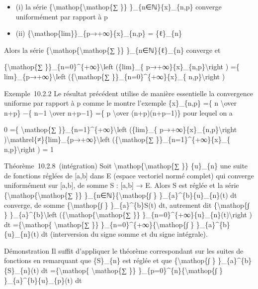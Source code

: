 \documentclass[]{article}
\begin{document}
\begin{itemize}
\itemsep1pt\parskip0pt
\item
  (i) la série \{\textbackslash{}mathop\{\textbackslash{}mathop\{∑ \}\}
  \}\_\{n∈ℕ\}\{x\}\_\{n,p\} converge uniformément par rapport à p
\item
  (ii) \{\textbackslash{}mathop\{lim\}\}\_\{p→+∞\}\{x\}\_\{n,p\} =
  \{ℓ\}\_\{n\}
\end{itemize}

Alors la série \{\textbackslash{}mathop\{\textbackslash{}mathop\{∑ \}\}
\}\_\{n∈ℕ\}\{ℓ\}\_\{n\} converge et

\{\textbackslash{}mathop\{∑ \}\}\_\{n=0\}\^{}\{+∞\}\textbackslash{}left
(\{lim\}\_\{ p→+∞\}\{x\}\_\{n,p\}\textbackslash{}right ) =\{
lim\}\_\{p→+∞\}\textbackslash{}left (\{\textbackslash{}mathop\{∑
\}\}\_\{n=0\}\^{}\{+∞\}\{x\}\_\{ n,p\}\textbackslash{}right )

Exemple~10.2.2 Le résultat précédent utilise de manière essentielle la
convergence uniforme par rapport à p comme le montre l'exemple
\{x\}\_\{n,p\} =\{ n \textbackslash{}over n+p\} −\{ n−1
\textbackslash{}over n+p−1\} =\{ p \textbackslash{}over (n+p)(n+p−1)\}
pour lequel on a

0 =\{ \textbackslash{}mathop\{∑
\}\}\_\{n=1\}\^{}\{+∞\}\textbackslash{}left (\{lim\}\_\{
p→+∞\}\{x\}\_\{n,p\}\textbackslash{}right
)\textbackslash{}mathrel\{≠\}\{lim\}\_\{p→+∞\}\textbackslash{}left
(\{\textbackslash{}mathop\{∑ \}\}\_\{n=1\}\^{}\{+∞\}\{x\}\_\{
n,p\}\textbackslash{}right ) = 1

Théorème~10.2.8~(intégration) Soit
\textbackslash{}mathop\{\textbackslash{}mathop\{∑ \}\} \{u\}\_\{n\} une
suite de fonctions réglées de {[}a,b{]} dans E (espace vectoriel normé
complet) qui converge uniformément sur {[}a,b{]}, de somme S : {[}a,b{]}
→ E. Alors S est réglée et la série
\{\textbackslash{}mathop\{\textbackslash{}mathop\{∑ \}\}
\}\_\{n∈ℕ\}\{\textbackslash{}mathop\{∫ \}
\}\_\{a\}\^{}\{b\}\{u\}\_\{n\}(t) dt converge, de somme
\{\textbackslash{}mathop\{∫ \} \}\_\{a\}\^{}\{b\}S(t) dt, autrement dit
\{\textbackslash{}mathop\{∫ \} \}\_\{a\}\^{}\{b\}\textbackslash{}left
(\{\textbackslash{}mathop\{\textbackslash{}mathop\{∑ \}\}
\}\_\{n=0\}\^{}\{+∞\}\{u\}\_\{n\}(t)\textbackslash{}right ) dt
=\{\textbackslash{}mathop\{ \textbackslash{}mathop\{∑ \}\}
\}\_\{n=0\}\^{}\{+∞\}\{\textbackslash{}mathop\{∫ \}
\}\_\{a\}\^{}\{b\}\{u\}\_\{n\}(t) dt (interversion du signe somme et du
signe intégrale).

Démonstration Il suffit d'appliquer le théorème correspondant sur les
suites de fonctions en remarquant que \{S\}\_\{n\} est réglée et que
\{\textbackslash{}mathop\{∫ \} \}\_\{a\}\^{}\{b\}\{S\}\_\{n\}(t) dt
=\{\textbackslash{}mathop\{ \textbackslash{}mathop\{∑ \}\}
\}\_\{p=0\}\^{}\{n\}\{\textbackslash{}mathop\{∫ \}
\}\_\{a\}\^{}\{b\}\{u\}\_\{p\}(t) dt
\end{document}
